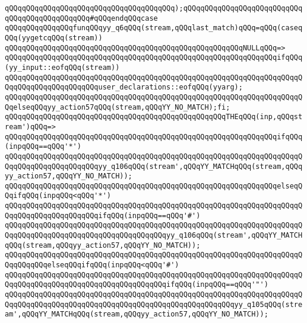 \verb|qQQqqQQqqQQqqQQqqQQqqQQqqQQqqQQqqQQqqQQq);qQQqqQQqqQQqqQQqqQQqqQQqqQQqqQQqqQQqqQQqqQQqqQQq#qQQqendqQQqcase|\newline
\verb|qQQqqQQqqQQqqQQqfunqQQqyy_q6qQQq(stream,qQQqlast_match)qQQq=qQQq(caseqQQq(yygetcqQQq(stream))|\newline
\verb|qQQqqQQqqQQqqQQqqQQqqQQqqQQqqQQqqQQqqQQqqQQqqQQqqQQqqQQqNULLqQQq=>|\newline
\verb|qQQqqQQqqQQqqQQqqQQqqQQqqQQqqQQqqQQqqQQqqQQqqQQqqQQqqQQqqQQqqQQqifqQQq(yy_input::eofqQQq(stream))|\newline
\verb|qQQqqQQqqQQqqQQqqQQqqQQqqQQqqQQqqQQqqQQqqQQqqQQqqQQqqQQqqQQqqQQqqQQqqQQqqQQqqQQqqQQqqQQqqQQquser_declarations::eofqQQq(yyarg);|\newline
\verb|qQQqqQQqqQQqqQQqqQQqqQQqqQQqqQQqqQQqqQQqqQQqqQQqqQQqqQQqqQQqqQQqqQQqqQQqelseqQQqyy_action57qQQq(stream,qQQqYY_NO_MATCH);fi;|\newline
\verb|qQQqqQQqqQQqqQQqqQQqqQQqqQQqqQQqqQQqqQQqqQQqqQQqqQQqTHEqQQq(inp,qQQqstream')qQQq=>|\newline
\verb|qQQqqQQqqQQqqQQqqQQqqQQqqQQqqQQqqQQqqQQqqQQqqQQqqQQqqQQqqQQqqQQqifqQQq(inpqQQq==qQQq'*')|\newline
\verb|qQQqqQQqqQQqqQQqqQQqqQQqqQQqqQQqqQQqqQQqqQQqqQQqqQQqqQQqqQQqqQQqqQQqqQQqqQQqqQQqqQQqqQQqqQQqyy_q106qQQq(stream',qQQqYY_MATCHqQQq(stream,qQQqyy_action57,qQQqYY_NO_MATCH));|\newline
\verb|qQQqqQQqqQQqqQQqqQQqqQQqqQQqqQQqqQQqqQQqqQQqqQQqqQQqqQQqqQQqqQQqelseqQQqifqQQq(inpqQQq<qQQq'*')|\newline
\verb|qQQqqQQqqQQqqQQqqQQqqQQqqQQqqQQqqQQqqQQqqQQqqQQqqQQqqQQqqQQqqQQqqQQqqQQqqQQqqQQqqQQqqQQqqQQqifqQQq(inpqQQq==qQQq'#')|\newline
\verb|qQQqqQQqqQQqqQQqqQQqqQQqqQQqqQQqqQQqqQQqqQQqqQQqqQQqqQQqqQQqqQQqqQQqqQQqqQQqqQQqqQQqqQQqqQQqqQQqqQQqqQQqqQQqyy_q106qQQq(stream',qQQqYY_MATCHqQQq(stream,qQQqyy_action57,qQQqYY_NO_MATCH));|\newline
\verb|qQQqqQQqqQQqqQQqqQQqqQQqqQQqqQQqqQQqqQQqqQQqqQQqqQQqqQQqqQQqqQQqqQQqqQQqqQQqqQQqelseqQQqifqQQq(inpqQQq<qQQq'#')|\newline
\verb|qQQqqQQqqQQqqQQqqQQqqQQqqQQqqQQqqQQqqQQqqQQqqQQqqQQqqQQqqQQqqQQqqQQqqQQqqQQqqQQqqQQqqQQqqQQqqQQqqQQqqQQqqQQqifqQQq(inpqQQq==qQQq'"')|\newline
\verb|qQQqqQQqqQQqqQQqqQQqqQQqqQQqqQQqqQQqqQQqqQQqqQQqqQQqqQQqqQQqqQQqqQQqqQQqqQQqqQQqqQQqqQQqqQQqqQQqqQQqqQQqqQQqqQQqqQQqqQQqqQQqyy_q105qQQq(stream',qQQqYY_MATCHqQQq(stream,qQQqyy_action57,qQQqYY_NO_MATCH));|\newline
